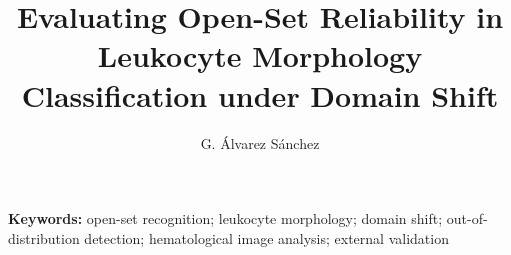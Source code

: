 \documentclass[11pt]{article}
\title{Evaluating Open-Set Reliability in Leukocyte Morphology Classification under Domain Shift}
\author{G. Álvarez Sánchez}
\date{}
\begin{document}
\maketitle



\noindent\textbf{Keywords:} open-set recognition; leukocyte morphology; domain shift; out-of-distribution detection; hematological image analysis; external validation












\end{document}
